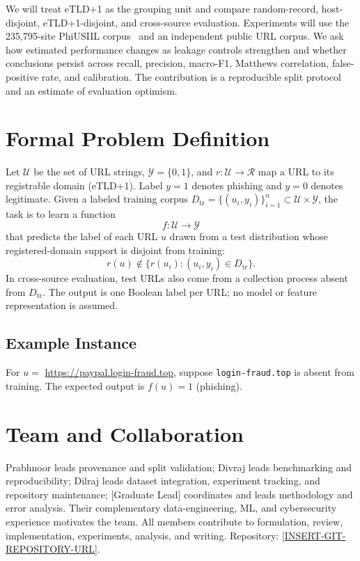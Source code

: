 \documentclass[sigconf,nonacm]{acmart}
\begin{document}
We will treat eTLD+1 as the grouping unit and compare random-record, host-disjoint, eTLD+1-disjoint, and cross-source evaluation. Experiments will use the 235,795-site PhiUSIIL corpus~\cite{prasad2024} and an independent public URL corpus. We ask how estimated performance changes as leakage controls strengthen and whether conclusions persist across recall, precision, macro-F1, Matthews correlation, false-positive rate, and calibration. The contribution is a reproducible split protocol and an estimate of evaluation optimism.

\section{Formal Problem Definition}
Let $\mathcal{U}$ be the set of URL strings, $\mathcal{Y}=\{0,1\}$, and $r:\mathcal{U}\rightarrow\mathcal{R}$ map a URL to its registrable domain (eTLD+1). Label $y=1$ denotes phishing and $y=0$ denotes legitimate. Given a labeled training corpus
$D_{\mathrm{tr}}=\{(u_i,y_i)\}_{i=1}^{n}\subset\mathcal{U}\times\mathcal{Y}$,
the task is to learn a function
\[
 f:\mathcal{U}\rightarrow\mathcal{Y}
\]
that predicts the label of each URL $u$ drawn from a test distribution whose registered-domain support is disjoint from training:
\[
 r(u)\notin\{r(u_i):(u_i,y_i)\in D_{\mathrm{tr}}\}.
\]
In cross-source evaluation, test URLs also come from a collection process absent from $D_{\mathrm{tr}}$. The output is one Boolean label per URL; no model or feature representation is assumed.

\subsection{Example Instance}
For $u=$ \url{https://paypal.login-fraud.top}, suppose \texttt{login-fraud.top} is absent from training. The expected output is $f(u)=1$ (phishing).

\section{Team and Collaboration}
Prabhnoor leads provenance and split validation; Divraj leads benchmarking and reproducibility; Dilraj leads dataset integration, experiment tracking, and repository maintenance; [Graduate Lead] coordinates and leads methodology and error analysis. Their complementary data-engineering, ML, and cybersecurity experience motivates the team. All members contribute to formulation, review, implementation, experiments, analysis, and writing. Repository: \url{[INSERT-GIT-REPOSITORY-URL]}.



\end{document}
